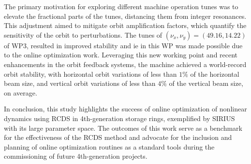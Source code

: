 The primary motivation for exploring different machine operation tunes was to elevate the fractional parts of the tunes, distancing them from integer resonances. This adjustment aimed to mitigate orbit amplification factors, which quantify the sensitivity of the orbit to perturbations. The tunes of $(\nu_x, \nu_y) = (49.16, 14.22)$ of \gls*{WP3}, resulted in improved stability and \gls*{ie} in this WP was made possible due to the online optimization work. Leveraging this new working point and recent enhancements in the orbit feedback systems, the machine achieved a world-record orbit stability, with horizontal orbit variations  of less than $1\%$ of the horizontal beam size, and vertical orbit variations of less than $4\%$ of the vertical beam size, on average.

In conclusion, this study highlights the success of online optimization of nonlinear dynamics using \gls*{RCDS} in 4th-generation storage rings, exemplified by SIRIUS with its large parameter space. The outcomes of this work serve as a benchmark for the effectiveness of the \gls*{RCDS} method and advocate for the inclusion and planning of online optimization routines as a standard tools during the commissioning of future 4th-generation projects.
